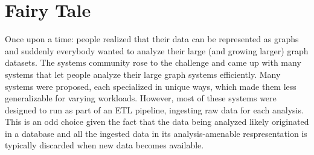 \chapter{Fairy Tale}


Once upon a time: people realized that their data can be represented as graphs and suddenly everybody wanted to analyze their large (and growing larger) graph datasets.
The systems community rose to the challenge and came up with many systems that let people analyze their large graph systems efficiently.
Many systems were proposed, each specialized in unique ways, which made them less generalizable for varying workloads.
However, most of these systems were designed to run as part of an ETL pipeline, ingesting raw data for each analysis.
This is an odd choice given the fact that the data being analyzed likely originated in a database and all the ingested data in its analysis-amenable respresentation is typically discarded when new data becomes available.

